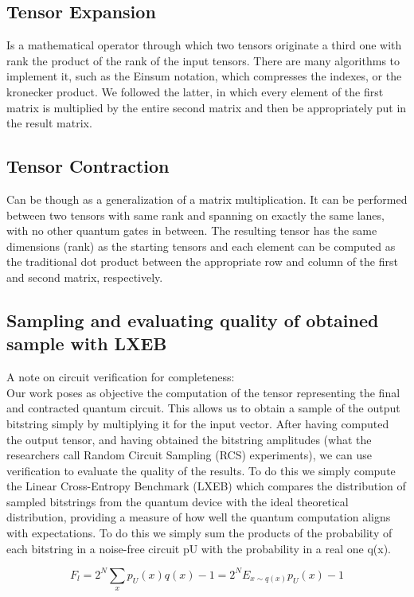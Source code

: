 \documentclass[12pt,oneside,a4paper]{article}
\begin{document}
\subsection{Tensor Expansion}
Is a mathematical operator through which two tensors originate a third one with rank the product of the rank of the input tensors. There are many algorithms to implement it, such as the Einsum notation, which compresses the indexes, or the kronecker product. We followed the latter, in which every element of the first matrix is multiplied by the entire second matrix and then be appropriately put in the result matrix.

\subsection{Tensor Contraction}
Can be though as a generalization of a matrix multiplication. It can be performed between two tensors with same rank and spanning on exactly the same lanes, with no other quantum gates in between. The resulting tensor has the same dimensions (rank) as the starting tensors and each element can be computed as the traditional dot product between the appropriate row and column of the first and second matrix, respectively.


\subsection{Sampling and evaluating quality of obtained sample with LXEB}
A note on circuit verification for completeness:\\
Our work poses as objective the computation of the tensor representing the final and contracted quantum circuit. This allows us to obtain a sample of the output bitstring simply by multiplying it for the input vector. After having computed the output tensor, and having obtained the bitstring amplitudes (what the researchers call Random Circuit Sampling (RCS) experiments), we can use verification to evaluate the quality of the results. To do this we simply compute the Linear Cross-Entropy Benchmark (LXEB) which compares the distribution of sampled bitstrings from the quantum device with the ideal theoretical distribution, providing a measure of how well the quantum computation aligns with expectations. To do this we simply sum the products of the probability of each bitstring in a noise-free circuit pU with the probability in a real one q(x). 

\begin{equation}
    F_l = 2^N \sum_x p_U(x)q(x) - 1 = 2^N E_{x \sim q(x)} p_U(x) - 1
\end{equation}
\end{document}
